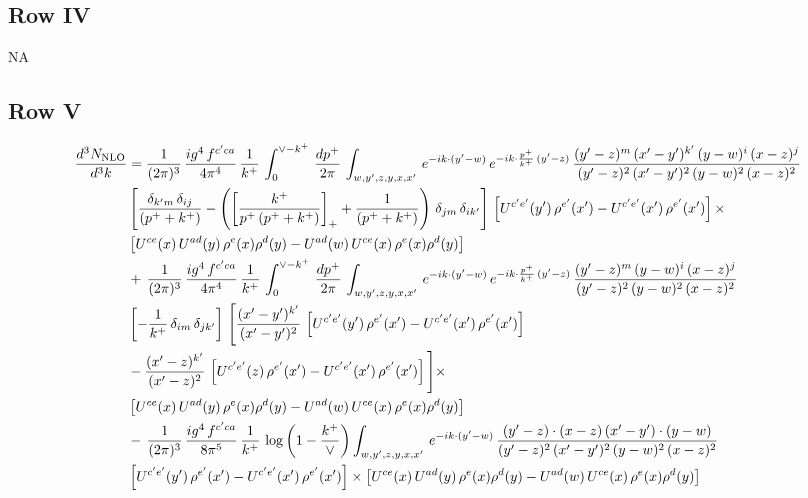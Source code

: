 \documentclass[9pt]{article}
\numberwithin{equation}{section}
\begin{document}
\subsection{Row IV}
\textsc{NA}
\subsection{Row V}
\begin{align}
    \frac{d^{3}N_{\rm NLO}}{d^{3}k} & =  \frac{1}{(2\pi)^{3}}\, \frac{ig^{4}\,f^{c'ca}}{4\pi^{4}}\, \frac{1}{k^{+}}\,\int_{0}^{\vee-k^{+}}\, \frac{dp^{+}}{2\pi}\, \int_{w,y',z,y,x,x'}\, e^{-ik\cdot (y'-w)}\, e^{-ik\cdot \frac{p^{+}}{k^{+}}\,(y'-z)}\,\frac{(y'-z)^{m}\,(x'-y')^{k'}\,(y-w)^{i}\,(x-z)^{j}}{(y'-z)^{2}\,(x'-y')^{2}\,(y-w)^{2}\,(x-z)^{2}}\notag \\ & \left[\frac{\delta_{k'm}\,\delta_{ij}}{(p^{+}+k^{+})}-\left(\left[\frac{k^{+}}{p^{+}\,(p^{+}+k^{+})}\right]_{+}+\frac{1}{(p^{+}+k^{+})}\right)\,\delta_{jm}\,\delta_{ik'}\right]\, \left[U^{c'e'}(y')\,\rho^{e'}(x')-U^{c'e'}(x')\,\rho^{e'}(x')\right]\times \notag \\ &  \left[U^{ce}(x)\,U^{ad}(y)\,\rho^{e}(x)\rho^{d}(y)-U^{ad}(w)\,U^{ce}(x)\,\rho^{e}(x)\rho^{d}(y)\right] \notag \\
&   +\,\frac{1}{(2\pi)^{3}}\, \frac{ig^{4}\,f^{c'ca}}{4\pi^{4}}\, \frac{1}{k^{+}}\,\int_{0}^{\vee-k^{+}}\, \frac{dp^{+}}{2\pi}\, \int_{w,y',z,y,x,x'}\, e^{-ik\cdot (y'-w)}\, e^{-ik\cdot \frac{p^{+}}{k^{+}}\,(y'-z)}\,\frac{(y'-z)^{m}\,(y-w)^{i}\,(x-z)^{j}}{(y'-z)^{2}\,(y-w)^{2}\,(x-z)^{2}}\notag \\ &   \left[-\frac{1}{k^{+}}\, \delta_{im}\, \delta_{jk'}\right]\, \Bigg[\frac{(x'-y')^{k'}}{(x'-y')^{2}}\,\left[U^{c'e'}(y')\,\rho^{e'}(x')-U^{c'e'}(x')\,\rho^{e'}(x')\right]\notag \\ & -\frac{(x'-z)^{k'}}{(x'-z)^{2}}\,\left[U^{c'e'}(z)\,\rho^{e'}(x')-U^{c'e'}(x')\,\rho^{e'}(x')\right]\Bigg]\times \notag \\ &    \left[U^{ce}(x)\,U^{ad}(y)\,\rho^{e}(x)\rho^{d}(y)-U^{ad}(w)\,U^{ce}(x)\,\rho^{e}(x)\rho^{d}(y)\right] \notag \\
& -\,\frac{1}{(2\pi)^{3}}\, \frac{ig^{4}\,f^{c'ca}}{8\pi^{5}}\, \frac{1}{k^{+}}\,\log{\left(1-\frac{k^{+}}{\vee}\right)} \int_{w,y',z,y,x,x'}\, e^{-ik\cdot (y'-w)}\,\frac{(y'-z)\cdot (x-z)\,(x'-y')\cdot (y-w)}{(y'-z)^{2}\,(x'-y')^{2}\,(y-w)^{2}\,(x-z)^{2}}\notag \\ & \left[U^{c'e'}(y')\,\rho^{e'}(x')-U^{c'e'}(x')\,\rho^{e'}(x')\right]\times  \left[U^{ce}(x)\,U^{ad}(y)\,\rho^{e}(x)\rho^{d}(y)-U^{ad}(w)\,U^{ce}(x)\,\rho^{e}(x)\rho^{d}(y)\right]
\end{align}
\end{document}
